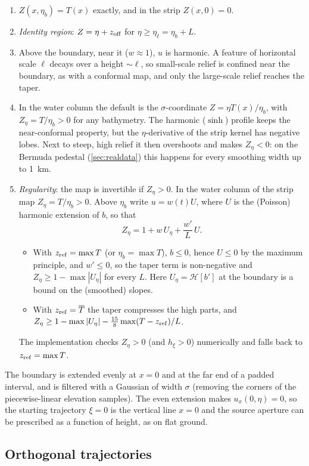 \documentclass[11pt,a4paper]{article}
\theoremstyle{remark}
\newcommand{\etab}{\eta_{b}}
\newcommand{\etal}{\eta_{\ell}}
\begin{document}
\begin{enumerate}
\item $Z(x,\etab)=T(x)$ exactly, and in the strip $Z(x,0)=0$.
\item \emph{Identity region}: $Z=\eta+z_{\rm off}$ for $\eta\ge\etal=\etab+L$.
\item Above the boundary, near it ($w\approx1$), $u$ is harmonic. A feature of
horizontal scale $\ell$ decays over a height $\sim\ell$, so small-scale relief is
confined near the boundary, as with a conformal map, and only the large-scale
relief reaches the taper.
\item In the water column the default is the $\sigma$-coordinate
$Z=\eta T(x)/\etab$, with $Z_\eta=T/\etab>0$ for any bathymetry. The harmonic
($\sinh$) profile keeps the near-conformal property, but the $\eta$-derivative
of the strip kernel has negative lobes. Next to steep, high relief it then
overshoots and makes $Z_\eta<0$: on the Bermuda pedestal (\cref{sec:realdata})
this happens for every smoothing width up to \SI{1}{km}.
\item \emph{Regularity}: the map is invertible if $Z_\eta>0$. In the water column
of the strip map $Z_\eta=T/\etab>0$. Above $\etab$ write $u=w(t)U$, where $U$ is
the (Poisson) harmonic extension of $b$, so that
\[
Z_\eta=1+w\,U_\eta+\frac{w'}{L}\,U .
\]
\begin{itemize}
\item With $z_{\rm ref}=\max T$ (or $\etab=\max T$), $b\le0$, hence $U\le0$ by the
maximum principle, and $w'\le0$, so the taper term is non-negative and
$Z_\eta\ge1-\max|U_\eta|$ for every $L$. Here $U_\eta=\mathcal H[b']$ at the
boundary is a bound on the (smoothed) slopes.
\item With $z_{\rm ref}=\overline T$ the taper compresses the high parts, and
$Z_\eta\ge1-\max|U_\eta|-\tfrac{15}{8}\max(T-z_{\rm ref})/L$.
\end{itemize}
The implementation checks $Z_\eta>0$ (and $h_\xi>0$) numerically and falls back
to $z_{\rm ref}=\max T$.
\end{enumerate}

The boundary is extended evenly at $x=0$ and at the far end of a padded
interval, and is filtered with a Gaussian of width $\sigma$ (removing the corners
of the piecewise-linear elevation samples). The even extension makes $u_x(0,\eta)=0$,
so the starting trajectory $\xi=0$ is the vertical line $x=0$ and the source
aperture can be prescribed as a function of height, as on flat ground.

\subsection{Orthogonal trajectories}
\end{document}
